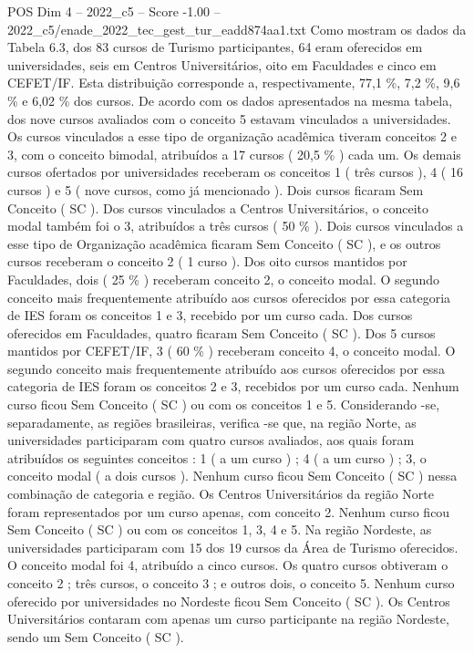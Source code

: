 \begin{textsample}{POS Dim 4 – 2022\_c5 – Score -1.00 – 2022\_c5/enade\_2022\_tec\_gest\_tur\_eadd874aa1.txt}
Como mostram os dados da Tabela 6.3, dos 83 cursos de Turismo participantes, 64 eram oferecidos em universidades, seis em Centros Universitários, oito em Faculdades e cinco em CEFET/IF.
Esta distribuição corresponde a, respectivamente, 77,1 \%, 7,2 \%, 9,6 \% e 6,02 \% dos cursos.
De acordo com os dados apresentados na mesma tabela, dos nove cursos avaliados com o conceito 5 estavam vinculados a universidades.
Os cursos vinculados a esse tipo de organização acadêmica tiveram conceitos 2 e 3, com o conceito bimodal, atribuídos a 17 cursos ( 20,5 \% ) cada um.
Os demais cursos ofertados por universidades receberam os conceitos 1 ( três cursos ), 4 ( 16 cursos ) e 5 ( nove cursos, como já mencionado ).
Dois cursos ficaram Sem Conceito ( SC ).
Dos cursos vinculados a Centros Universitários, o conceito modal também foi o 3, atribuídos a três cursos ( 50 \% ).
Dois cursos vinculados a esse tipo de Organização acadêmica ficaram Sem Conceito ( SC ), e os outros cursos receberam o conceito 2 ( 1 curso ).
Dos oito cursos mantidos por Faculdades, dois ( 25 \% ) receberam conceito 2, o conceito modal.
O segundo conceito mais frequentemente atribuído aos cursos oferecidos por essa categoria de IES foram os conceitos 1 e 3, recebido por um curso cada.
Dos cursos oferecidos em Faculdades, quatro ficaram Sem Conceito ( SC ).
Dos 5 cursos mantidos por CEFET/IF, 3 ( 60 \% ) receberam conceito 4, o conceito modal.
O segundo conceito mais frequentemente atribuído aos cursos oferecidos por essa categoria de IES foram os conceitos 2 e 3, recebidos por um curso cada.
Nenhum curso ficou Sem Conceito ( SC ) ou com os conceitos 1 e 5.
Considerando -se, separadamente, as regiões brasileiras, verifica -se que, na região Norte, as universidades participaram com quatro cursos avaliados, aos quais foram atribuídos os seguintes conceitos : 1 ( a um curso ) ; 4 ( a um curso ) ; 3, o conceito modal ( a dois cursos ).
Nenhum curso ficou Sem Conceito ( SC ) nessa combinação de categoria e região.
Os Centros Universitários da região Norte foram representados por um curso apenas, com conceito 2.
Nenhum curso ficou Sem Conceito ( SC ) ou com os conceitos 1, 3, 4 e 5.
Na região Nordeste, as universidades participaram com 15 dos 19 cursos da Área de Turismo oferecidos.
O conceito modal foi 4, atribuído a cinco cursos.
Os quatro cursos obtiveram o conceito 2 ; três cursos, o conceito 3 ; e outros dois, o conceito 5.
Nenhum curso oferecido por universidades no Nordeste ficou Sem Conceito ( SC ).
Os Centros Universitários contaram com apenas um curso participante na região Nordeste, sendo um Sem Conceito ( SC ).

\end{textsample}
